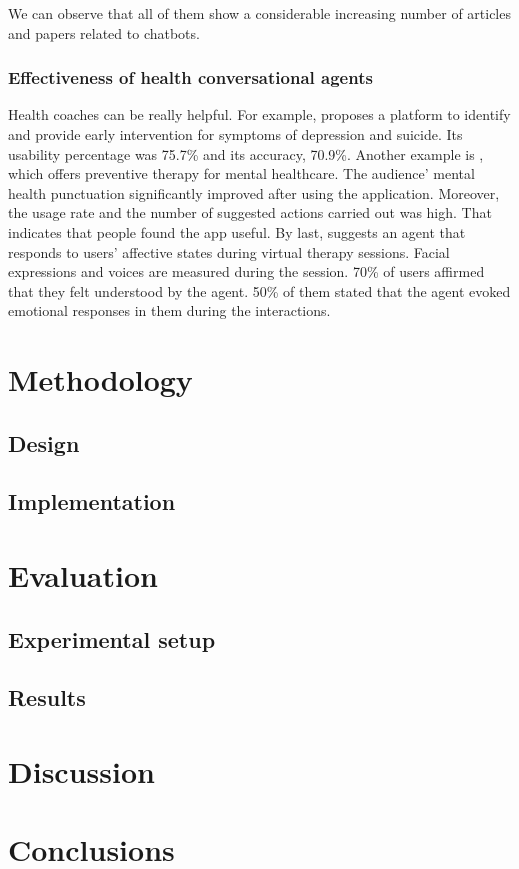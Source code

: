 \documentclass[12pt,english]{article}
\begin{document}
We can observe that all of them show a considerable increasing number of articles and papers related to chatbots.



\subsubsection{Effectiveness of health conversational agents}

Health coaches can be really helpful. For example, \cite{Breso2016297} proposes a platform to identify and provide early intervention for symptoms of depression and suicide. Its usability percentage was 75.7\% and its accuracy, 70.9\%. Another example is \cite{Hirano2017}, which offers preventive therapy for mental healthcare. The audience' mental health punctuation significantly improved after using the application. Moreover, the usage rate and the number of suggested actions carried out was high. That indicates that people found the app useful. By last, \cite{Ring2016} suggests an agent that responds to users' affective states during virtual therapy sessions. Facial expressions and voices are measured during the session. 70\% of users affirmed that they felt understood by the agent. 50\% of them stated that the agent evoked emotional responses in them during the interactions.


\section{Methodology}

\subsection{Design}

\subsection{Implementation}


\section{Evaluation}

\subsection{Experimental setup}

\subsection{Results}


\section{Discussion}

\section{Conclusions}


\newpage


\end{document}
